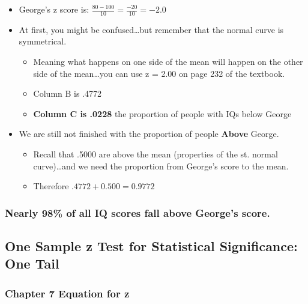 \documentclass[]{article}
\begin{document}
\begin{itemize}
\itemsep1pt\parskip0pt
\item
  George's z score is: $\frac{80 - 100}{10}=\frac{-20}{10}=-2.0$
\item
  At first, you might be confused\ldots{}but remember that the normal
  curve is symmetrical.

  \begin{itemize}
  \itemsep1pt\parskip0pt
  \item
    Meaning what happens on one side of the mean will happen on the
    other side of the mean\ldots{}you can use z = 2.00 on page 232 of
    the textbook.
  \item
    Column B is .4772
  \item
    \textbf{Column C is .0228} the proportion of people with IQs below
    George
  \end{itemize}
\item
  We are still not finished with the proportion of people \textbf{Above}
  George.

  \begin{itemize}
  \itemsep1pt\parskip0pt
  \item
    Recall that .5000 are above the mean (properties of the st. normal
    curve)\ldots{}and we need the proportion from George's score to the
    mean.
  \item
    Therefore $.4772 + 0.500 = 0.9772$
  \end{itemize}
\end{itemize}

\subsubsection{Nearly 98\% of all IQ scores fall above George's
score.}\label{nearly-98-of-all-iq-scores-fall-above-georges-score.}

\subsection{One Sample z Test for Statistical Significance: One
Tail}\label{one-sample-z-test-for-statistical-significance-one-tail}

\subsubsection{Chapter 7 Equation for z}\label{chapter-7-equation-for-z}
\end{document}
